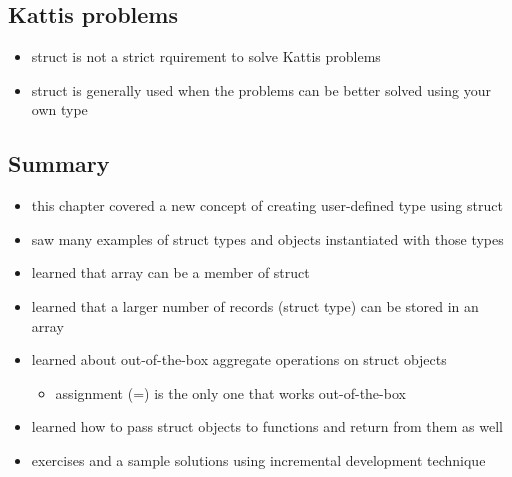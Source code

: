 \documentclass[11pt]{article}
\makeatletter
\providecommand{\tightlist}{%
      \setlength{\itemsep}{0pt}\setlength{\parskip}{0pt}}
\newcommand{\boxspacing}{\kern\kvtcb@left@rule\kern\kvtcb@boxsep}
\newcommand{\prompt}[4]{
        {\ttfamily\llap{{\color{#2}[#3]:\hspace{3pt}#4}}\vspace{-\baselineskip}}
    }
\makeatother
\begin{document}
    \hypertarget{kattis-problems}{%
\subsection{Kattis problems}\label{kattis-problems}}

\begin{itemize}
\tightlist
\item
  struct is not a strict rquirement to solve Kattis problems
\item
  struct is generally used when the problems can be better solved using
  your own type
\end{itemize}

    \hypertarget{summary}{%
\subsection{Summary}\label{summary}}

\begin{itemize}
\tightlist
\item
  this chapter covered a new concept of creating user-defined type using
  struct
\item
  saw many examples of struct types and objects instantiated with those
  types
\item
  learned that array can be a member of struct
\item
  learned that a larger number of records (struct type) can be stored in
  an array
\item
  learned about out-of-the-box aggregate operations on struct objects

  \begin{itemize}
  \tightlist
  \item
    assignment (=) is the only one that works out-of-the-box
  \end{itemize}
\item
  learned how to pass struct objects to functions and return from them
  as well
\item
  exercises and a sample solutions using incremental development
  technique
\end{itemize}

    \begin{tcolorbox}[breakable, size=fbox, boxrule=1pt, pad at break*=1mm,colback=cellbackground, colframe=cellborder]
\prompt{In}{incolor}{ }{\boxspacing}
\begin{Verbatim}[commandchars=\\\{\}]

\end{Verbatim}
\end{tcolorbox}


    
    
    
\end{document}

